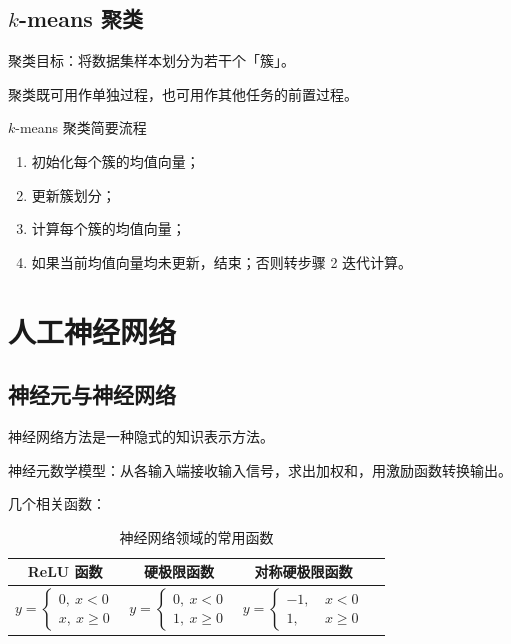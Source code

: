 \documentclass[UTF8]{ctexart}
\begin{document}
\subsection{$k$-means 聚类}
聚类目标：将数据集样本划分为若干个「簇」。

聚类既可用作单独过程，也可用作其他任务的前置过程。

\begin{process}{$k$-means 聚类简要流程}
\begin{enumerate}[itemsep=0pt,parsep=0pt]
  \item 初始化每个簇的均值向量；
  \item 更新簇划分；
  \item 计算每个簇的均值向量；
  \item 如果当前均值向量均未更新，结束；否则转步骤 2 迭代计算。
\end{enumerate}
\end{process}

\section{人工神经网络}
\subsection{神经元与神经网络}
神经网络方法是一种隐式的知识表示方法。

神经元数学模型：从各输入端接收输入信号，求出加权和，用激励函数转换输出。

几个相关函数：
\begin{table}[htb]
  \centering
  \begin{tabular}{cccc}
  \toprule
    ReLU 函数 & 硬极限函数 & 对称硬极限函数 \\
  \midrule
    $y = \begin{cases} 0, \ x<0 \\ x,\ x\geqslant 0\end{cases}$ &
    $y = \begin{cases} 0, \ x<0 \\ 1,\ x\geqslant 0\end{cases}$ &
    $y = \begin{cases} -1, \ & x<0 \\ 1,\ & x\geqslant 0\end{cases}$ \\
  \bottomrule
  \end{tabular}
  \caption{神经网络领域的常用函数}\label{fig:func}
\end{table}
\end{document}
